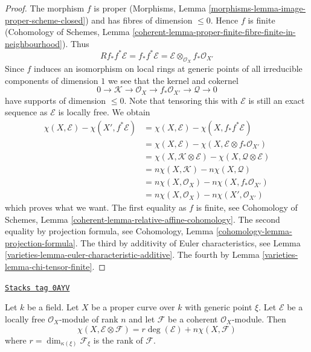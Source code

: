 \begin{proof}

The morphism $f$ is proper
(Morphisms, Lemma \ref{morphisms-lemma-image-proper-scheme-closed})
and has fibres of dimension $\leq 0$. Hence $f$ is finite
(Cohomology of Schemes, Lemma
\ref{coherent-lemma-proper-finite-fibre-finite-in-neighbourhood}).
Thus
$$
Rf_*f^*\mathcal{E} = f_*f^*\mathcal{E} =
\mathcal{E} \otimes_{\mathcal{O}_X} f_*\mathcal{O}_{X'}
$$
Since $f$ induces an isomorphism on local rings at generic points of
all irreducible components of dimension $1$ we see that the kernel
and cokernel
$$
0 \to \mathcal{K} \to \mathcal{O}_X \to f_*\mathcal{O}_{X'}
\to \mathcal{Q} \to 0
$$
have supports of dimension $\leq 0$. Note that tensoring this with
$\mathcal{E}$ is still an exact sequence as $\mathcal{E}$ is locally free.
We obtain
\begin{align*}
\chi(X, \mathcal{E}) - \chi(X', f^*\mathcal{E})
& =
\chi(X, \mathcal{E}) - \chi(X, f_*f^*\mathcal{E}) \\
& =
\chi(X, \mathcal{E}) - \chi(X, \mathcal{E} \otimes f_*\mathcal{O}_{X'}) \\
& =
\chi(X, \mathcal{K} \otimes \mathcal{E}) -
\chi(X, \mathcal{Q} \otimes \mathcal{E}) \\
& =
n\chi(X, \mathcal{K}) -
n\chi(X, \mathcal{Q}) \\
& =
n\chi(X, \mathcal{O}_X) - n\chi(X, f_*\mathcal{O}_{X'}) \\
& =
n\chi(X, \mathcal{O}_X) - n\chi(X', \mathcal{O}_{X'})
\end{align*}
which proves what we want. The first equality as $f$ is finite, see
Cohomology of Schemes, Lemma \ref{coherent-lemma-relative-affine-cohomology}.
The second equality by projection formula, see
Cohomology, Lemma \ref{cohomology-lemma-projection-formula}.
The third by additivity of Euler characteristics, see
Lemma \ref{varieties-lemma-euler-characteristic-additive}.
The fourth by Lemma \ref{varieties-lemma-chi-tensor-finite}.
\end{proof}

\begin{lemma}
\label{varieties-lemma-degree-on-proper-curve}
\href{https://stacks.math.columbia.edu/tag/0AYV}{\texttt{Stacks tag 0AYV}}

Let $k$ be a field. Let $X$ be a proper curve over $k$ with generic point
$\xi$. Let $\mathcal{E}$ be a locally free $\mathcal{O}_X$-module of rank $n$
and let $\mathcal{F}$ be a coherent $\mathcal{O}_X$-module. Then
$$
\chi(X, \mathcal{E} \otimes \mathcal{F}) =
r \deg(\mathcal{E}) + n \chi(X, \mathcal{F})
$$
where $r = \dim_{\kappa(\xi)} \mathcal{F}_\xi$ is the rank of $\mathcal{F}$.
\end{lemma}

